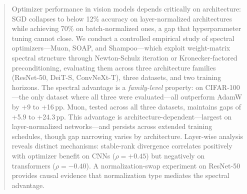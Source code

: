 \begin{abstract}
Optimizer performance in vision models depends critically on architecture: SGD collapses to below 12\% accuracy on layer-normalized architectures while achieving 70\% on batch-normalized ones, a gap that hyperparameter tuning cannot close.
We conduct a controlled empirical study of spectral optimizers---Muon, SOAP, and Shampoo---which exploit weight-matrix spectral structure through Newton-Schulz iteration or Kronecker-factored preconditioning, evaluating them across three architecture families (ResNet-50, DeiT-S, ConvNeXt-T), three datasets, and two training horizons.
The spectral advantage is a \emph{family-level} property: on CIFAR-100---the only dataset where all three were evaluated---all outperform AdamW by +9 to +16\,pp. Muon, tested across all three datasets, maintains gaps of +5.9 to +24.3\,pp.
This advantage is architecture-dependent---largest on layer-normalized networks---and persists across extended training schedules, though gap narrowing varies by architecture. Layer-wise analysis reveals distinct mechanisms: stable-rank divergence correlates positively with optimizer benefit on CNNs ($\rho{=}+0.45$) but negatively on transformers ($\rho{=}{-}0.40$).
A normalization-swap experiment on ResNet-50 provides causal evidence that normalization type mediates the spectral advantage.
\end{abstract}
